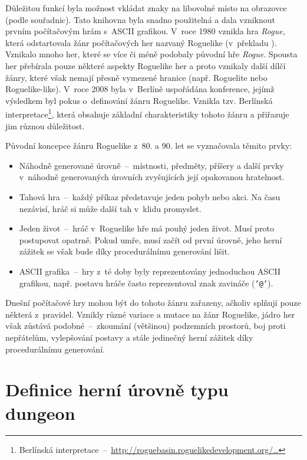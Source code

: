 Důležitou funkcí byla možnost vkládat znaky na libovolné místo na obrazovce (podle souřadnic).
Tato knihovna byla snadno použitelná a dala vzniknout prvním počítačovým hrám s~ASCII grafikou.
V~roce 1980 vznikla hra \textit{Rogue}, která odstartovala žánr počítačových her nazvaný Roguelike (v~překladu ).
Vznikalo mnoho her, které se více či méně podobaly původní hře \textit{Rogue}.
Spousta her přebírala pouze některé aspekty Roguelike her a proto vznikaly další dílčí žánry, které však nemají přesně vymezené hranice (např. Roguelite nebo Roguelike-like)\cite{lit:pcg_history}.
V~roce 2008 byla v~Berlíně uspořádána konference, jejímž výsledkem byl pokus o~definování žánru Roguelike.
Vznikla tzv. Berlínská interpretace\footnote{Berlínská interpretace~--~\href{http://roguebasin.roguelikedevelopment.org/index.php?title=Berlin_Interpretation}{http://roguebasin.roguelikedevelopment.org/\dots}}, která obsahuje základní charakteristiky tohoto žánru a přiřazuje jim různou důležitost.
\par \noindent
Původní koncepce žánru Roguelike z~80. a 90. let se vyznačovala těmito prvky:
\begin{itemize}
    \item Náhodně generované úrovně~--~místnosti, předměty, příšery a další prvky v~náhodně generovaných úrovních zvyšujících její opakovanou hratelnost.
    \item Tahová hra~--~každý příkaz představuje jeden pohyb nebo akci.
    Na času nezávisí, hráč si může další tah v~klidu promyslet.
    \item Jeden život~--~hráč v~Roguelike hře má pouhý jeden život.
    Musí proto postupovat opatrně.
    Pokud umře, musí začít od první úrovně, jeho herní zážitek se však bude díky procedurálnímu generování lišit.
    \item ASCII grafika~--~hry z~té doby byly reprezentovány jednoduchou ASCII grafikou, např. postavu hráče často reprezentoval znak zavináče (\texttt{'@'}).
\end{itemize}
Dnešní počítačové hry mohou být do tohoto žánru zařazeny, ačkoliv splňují pouze některá z~pravidel.
Vznikly různé variace a mutace na žánr Roguelike, jádro her však zůstává podobné~--~zkoumání (většinou) podzemních prostorů, boj proti nepřátelům, vylepšování postavy a stále jedinečný herní zážitek díky procedurálnímu generování.


\section{Definice herní úrovně typu dungeon}
\label{sec:definice_dungeonu}

